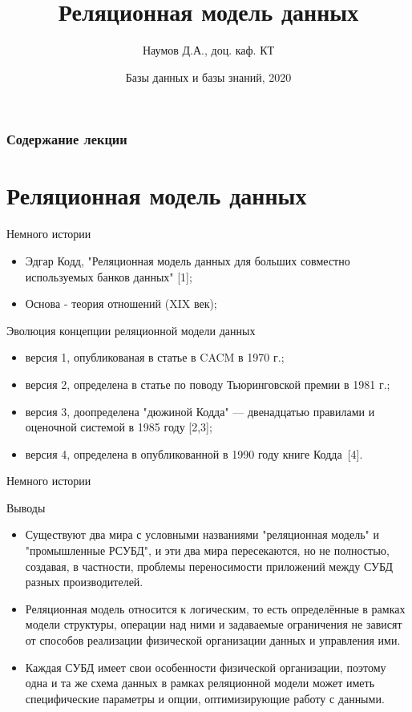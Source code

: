 \documentclass{beamer}
\title[СУБД]{Реляционная модель данных}
\author{Наумов Д.А., доц. каф. КТ}
\date[01.03.2020] {Базы данных и базы знаний, 2020}
\begin{document}
\begin{frame}
  \titlepage
\end{frame}
  
\begin{frame}
  \frametitle{Содержание лекции}
  \tableofcontents  
\end{frame}
  
\section{Реляционная модель данных}
\begin{frame}{Немного истории}
\begin{itemize}
\item Эдгар Кодд, "Реляционная модель данных для больших совместно используемых банков данных" [1];
\item Основа - теория отношений (XIX век);
\end{itemize}
\begin{block}{Эволюция концепции реляционной модели данных}
\begin{itemize}
\item версия 1, опубликованая в статье в CACM в 1970 г.;
\item версия 2, определена в статье по поводу Тьюринговской премии в 1981 г.;
\item версия 3, доопределена "дюжиной Кодда" — двенадцатью правилами и оценочной системой в 1985 году [2,3];
\item версия 4, определена в опубликованной в 1990 году книге Кодда~[4].
\end{itemize}
\end{block}
\end{frame} 

\begin{frame}{Немного истории}
\begin{block}{Выводы}
\begin{itemize}
\item Существуют два мира с условными названиями "реляционная модель" и "промышленные РСУБД", и эти два мира
пересекаются, но не полностью, создавая, в частности, проблемы переносимости приложений между СУБД разных производителей.
\item Реляционная модель относится к логическим, то есть определённые в рамках модели
структуры, операции над ними и задаваемые ограничения не зависят от способов реализации физической организации данных и управления ими.
\item Каждая СУБД имеет свои особенности физической организации, поэтому одна и та же схема данных в рамках реляционной модели может иметь специфические параметры и опции, оптимизирующие работу с данными.
\end{itemize}
\end{block}
\end{frame} 
\end{document}
